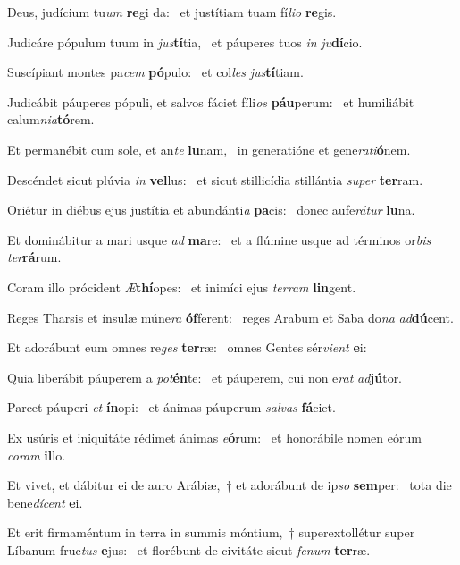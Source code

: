 \item Deus, judícium tu\textit{um} \textbf{re}gi da:~\psstar{} et justítiam tuam fí\textit{lio} \textbf{re}gis.
\item Judicáre pópulum tuum in \textit{jus}\textbf{tí}tia,~\psstar{} et páuperes tuos \textit{in} \textit{ju}\textbf{dí}cio.
\item Suscípiant montes pa\textit{cem} \textbf{pó}pulo:~\psstar{} et col\textit{les} \textit{jus}\textbf{tí}tiam.
\item Judicábit páuperes pópuli, et salvos fáciet fíli\textit{os} \textbf{páu}perum:~\psstar{} et humiliábit calum\textit{nia}\textbf{tó}rem.
\item Et permanébit cum sole, et an\textit{te} \textbf{lu}nam,~\psstar{} in generatióne et gene\textit{rati}\textbf{ó}nem.
\item Descéndet sicut plúvia \textit{in} \textbf{vel}lus:~\psstar{} et sicut stillicídia stillántia \textit{super} \textbf{ter}ram.
\item Oriétur in diébus ejus justítia et abundánti\textit{a} \textbf{pa}cis:~\psstar{} donec aufe\textit{rátur} \textbf{lu}na.
\item Et dominábitur a mari usque \textit{ad} \textbf{ma}re:~\psstar{} et a flúmine usque ad términos or\textit{bis} \textit{ter}\textbf{rá}rum.
\item Coram illo prócident \textit{Æ}\textbf{thí}opes:~\psstar{} et inimíci ejus \textit{terram} \textbf{lin}gent.
\item Reges Tharsis et ínsulæ múne\textit{ra} \textbf{óf}ferent:~\psstar{} reges Arabum et Saba do\textit{na} \textit{ad}\textbf{dú}cent.
\item Et adorábunt eum omnes re\textit{ges} \textbf{ter}ræ:~\psstar{} omnes Gentes sér\textit{vient} \textbf{e}i:
\item Quia liberábit páuperem a \textit{pot}\textbf{én}te:~\psstar{} et páuperem, cui non e\textit{rat} \textit{ad}\textbf{jú}tor.
\item Parcet páuperi \textit{et} \textbf{ín}opi:~\psstar{} et ánimas páuperum \textit{salvas} \textbf{fá}ciet.
\item Ex usúris et iniquitáte rédimet ánimas \textit{e}\textbf{ó}rum:~\psstar{} et honorábile nomen eórum \textit{coram} \textbf{il}lo.
\item Et vivet, et dábitur ei de auro Arábiæ,~† et adorábunt de ip\textit{so} \textbf{sem}per:~\psstar{} tota die bene\textit{dícent} \textbf{e}i.
\item Et erit firmaméntum in terra in summis móntium,~† superextollétur super Líbanum fruc\textit{tus} \textbf{e}jus:~\psstar{} et florébunt de civitáte sicut \textit{fenum} \textbf{ter}ræ.
